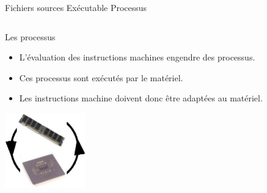\begin{frame}{Fichiers sources \textrightarrow Exécutable
    \textrightarrow Processus}
\begin{columns}
\begin{column}{3.8cm}
      \begin{block}{Les processus}
        \begin{itemize}
        \item L'évaluation des instructions machines engendre des
          processus.
        \item Ces processus sont exécutés par le matériel.
        \item Les instructions machine doivent donc être adaptées au
          matériel.
        \end{itemize}
      \end{block}
      \includegraphics[width=3.5cm]{img/s03/fichier_1_5.jpg}
    \end{column}
  \end{columns}
	
\end{frame}


